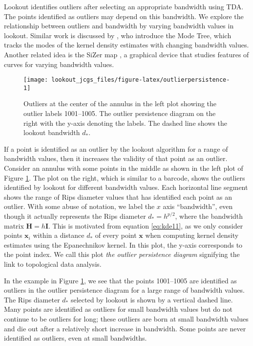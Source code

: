 \documentclass[12pt]{article}
\theoremstyle{definition}
\theoremstyle{definition}
\theoremstyle{definition}
\theoremstyle{definition}
\theoremstyle{remark}
\begin{document}
Lookout identifies outliers after selecting an appropriate bandwidth using TDA. The points identified as outliers may depend on this bandwidth. We explore the relationship between outliers and bandwidth by varying bandwidth values in lookout. Similar work is discussed by \citet{Minnotte1993}, who introduce the Mode Tree, which tracks the modes of the kernel density estimates with changing bandwidth values. Another related idea is the SiZer map \citep{Chaudhuri1999}, a graphical device that studies features of curves for varying bandwidth values.

\begin{figure}

{\centering \texttt{[image: lookout\_jcgs\_files/figure-latex/outlierpersistence-1]} 

}

\caption{Outliers at the center of the annulus in the left plot showing the outlier labels 1001--1005. The outlier persistence diagram on the right with the y-axis denoting the labels. The dashed line shows the lookout bandwidth $d_*$.}\label{fig:outlierpersistence}
\end{figure}

If a point is identified as an outlier by the lookout algorithm for a range of bandwidth values, then it increases the validity of that point as an outlier. Consider an annulus with some points in the middle as shown in the left plot of Figure \ref{fig:outlierpersistence}. The plot on the right, which is similar to a barcode, shows the outliers identified by lookout for different bandwidth values. Each horizontal line segment shows the range of Rips diameter values that has identified each point as an outlier. With some abuse of notation, we label the \(x\) axis ``bandwidth'', even though it actually represents the Rips diameter \(d_* = h^{p/2}\), where the bandwidth matrix \(\bm{H} = h\bm{I}\). This is motivated from equation \eqref{eq:kde11}, as we only consider points \(\bm{x}_i\) within a distance \(d_*\) of every point \(\bm{x}\) when computing kernel density estimates using the Epanechnikov kernel. In this plot, the y-axis corresponds to the point index. We call this plot \emph{the outlier persistence diagram} signifying the link to topological data analysis.

In the example in Figure \ref{fig:outlierpersistence}, we see that the points 1001--1005 are identified as outliers in the outlier persistence diagram for a large range of bandwidth values. The Rips diameter \(d_*\) selected by lookout is shown by a vertical dashed line. Many points are identified as outliers for small bandwidth values but do not continue to be outliers for long; these outliers are born at small bandwidth values and die out after a relatively short increase in bandwidth. Some points are never identified as outliers, even at small bandwidths.
\end{document}
